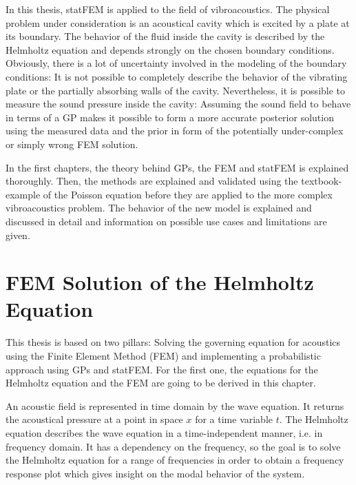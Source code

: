 \documentclass[%
  a4paper,oneside,%
  11pt,%
  smallchapters,
  style=printdev,
  extramargin,
  green,%
  rgb, <cmyk>
  ]{tubsbook}
\begin{document}
In this thesis, statFEM is applied to the field of vibroacoustics. The physical problem under consideration is an acoustical cavity which is excited by a plate at its boundary. The behavior of the fluid inside the cavity is described by the Helmholtz equation and depends strongly on the chosen boundary conditions. Obviously, there is a lot of uncertainty involved in the modeling of the boundary conditions: It is not possible to completely describe the behavior of the vibrating plate or the partially absorbing walls of the cavity. Nevertheless, it is possible to measure the sound pressure inside the cavity: Assuming the sound field to behave in terms of a GP makes it possible to form a more accurate posterior solution using the measured data and the prior in form of the potentially under-complex or simply wrong FEM solution.

In the first chapters, the theory behind GPs, the FEM and statFEM is explained thoroughly. Then, the methods are explained and validated using the textbook-example of the Poisson equation before they are applied to the more complex vibroacoustics problem. The behavior of the new model is explained and discussed in detail and information on possible use cases and limitations are given.


\chapter{FEM Solution of the Helmholtz Equation}
This thesis is based on two pillars: Solving the governing equation for acoustics using the Finite Element Method (FEM) and implementing a probabilistic approach using GPs and statFEM. For the first one, the equations for the Helmholtz equation and the FEM are going to be derived in this chapter.

An acoustic field is represented in time domain by the wave equation. It returns the acoustical pressure at a point in space $x$ for a time variable $t$.
The Helmholtz equation describes the wave equation in a time-independent manner, i.e. in frequency domain. It has a dependency on the frequency, so the goal is to solve the Helmholtz equation for a range of frequencies in order to obtain a frequency response plot which gives insight on the modal behavior of the system.
\end{document}
